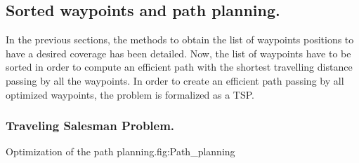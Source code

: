   \subsection{Sorted waypoints and path planning.} \label{sec:sorted}
In the previous sections, the methods to obtain the list of waypoints positions to have a desired coverage has been detailed. Now, the list of waypoints have to be sorted in order to compute an efficient path with the shortest travelling distance passing by all the waypoints. In order to create an efficient path passing by all optimized waypoints, the problem is formalized as a TSP. %

 
\subsubsection*{Traveling Salesman Problem. }\label{sec:TSP2}


\begin{mfigures}[!]{Optimization of the path planning.}{fig:Path_planning} \centering
{}
\hspace{1cm}
\end{mfigures}	

